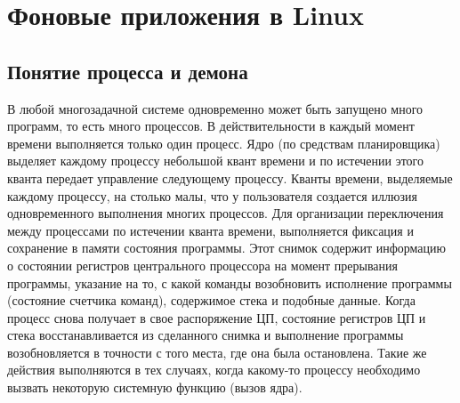 \newpage
\section{Фоновые приложения в Linux}

\subsection{Понятие процесса и демона}

В любой многозадачной системе одновременно может быть запущено много программ, то есть много процессов. В действительности в каждый момент времени выполняется только один процесс. Ядро (по средствам планировщика) выделяет каждому процессу небольшой квант времени и по истечении этого кванта передает управление следующему процессу. Кванты времени, выделяемые каждому процессу, на столько малы, что у пользователя создается иллюзия одновременного выполнения многих процессов. Для организации переключения между процессами по истечении кванта времени, выполняется фиксация и сохранение в памяти состояния программы. Этот снимок содержит информацию о состоянии регистров центрального процессора на момент прерывания программы, указание на то, с какой команды возобновить исполнение программы (состояние счетчика команд), содержимое стека и подобные данные. Когда процесс снова получает в свое распоряжение ЦП, состояние регистров ЦП и стека восстанавливается из сделанного снимка и выполнение программы возобновляется в точности с того места, где она была остановлена. Такие же действия выполняются в тех случаях, когда какому-то процессу необходимо вызвать некоторую системную функцию (вызов ядра)\cite{Cit1}.

